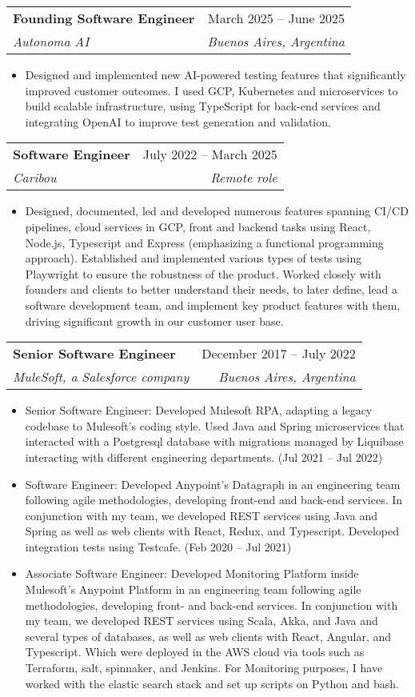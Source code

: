 \documentclass[letterpaper,11pt]{article}
\makeatletter
\newcommand{\resumeItem}[1]{
  \item\small{
    {#1 \vspace{-2pt}}
  }
}
\newcommand{\resumeSubheading}[4]{
  \vspace{-2pt}\item
    \begin{tabular*}{0.97\textwidth}[t]{l@{\extracolsep{\fill}}r}
      \textbf{#1} & #2 \\
      \textit{\small#3} & \textit{\small #4} \\
    \end{tabular*}\vspace{-7pt}
}
\newcommand{\resumeItemListStart}{\begin{itemize}}
\newcommand{\resumeItemListEnd}{\end{itemize}\vspace{-5pt}}
\makeatother
\begin{document}
    \resumeSubheading
      {Founding Software Engineer}{March 2025 -- June 2025}
      {Autonoma AI}{Buenos Aires, Argentina}
      \resumeItemListStart
        \resumeItem{Designed and implemented new AI-powered testing features that significantly improved customer outcomes. I used GCP, Kubernetes and microservices to build scalable infrastructure, using TypeScript for back-end services and integrating OpenAI to improve test generation and validation.}
        \resumeItemListEnd

    \resumeSubheading
      {Software Engineer}{July 2022 -- March 2025}
      {Caribou}{Remote role}
      \resumeItemListStart
        \resumeItem{Designed, documented, led and developed numerous features spanning CI/CD pipelines, cloud services in GCP, front and backend tasks using React, Node.js, Typescript and Express (emphasizing a functional programming approach). Established and implemented various types of tests using Playwright to ensure the robustness of the product. Worked closely with founders and clients to better understand their needs, to later define, lead a software development team, and implement key product features with them, driving significant growth in our customer user base.}
      \resumeItemListEnd

    \resumeSubheading
      {Senior Software Engineer}{December 2017 -- July 2022}
      {MuleSoft, a Salesforce company}{Buenos Aires, Argentina}
      \resumeItemListStart
        \resumeItem{Senior Software Engineer: Developed Mulesoft RPA, adapting a legacy codebase to Mulesoft's coding style. Used Java and Spring microservices that interacted with a Postgresql database with migrations managed by Liquibase interacting with different engineering departments. (Jul 2021 -- Jul 2022)}
        \resumeItem{Software Engineer: Developed Anypoint's Datagraph in an engineering team following agile methodologies, developing front-end and back-end services. In conjunction with my team, we developed REST services using Java and Spring as well as web clients with React, Redux, and Typescript. Developed integration tests using Testcafe. (Feb 2020 -- Jul 2021)}
        \resumeItem{Associate Software Engineer: Developed Monitoring Platform inside Mulesoft's Anypoint Platform in an engineering team following agile methodologies, developing front- and back-end services. In conjunction with my team, we developed REST services using Scala, Akka, and Java and several types of databases, as well as web clients with React, Angular, and Typescript. Which were deployed in the AWS cloud via tools such as Terraform, salt, spinnaker, and Jenkins. For Monitoring purposes, I have worked with the elastic search stack and set up scripts on Python and bash.}
    \resumeItemListEnd
\end{document}
